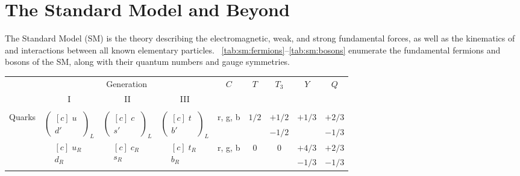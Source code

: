 \newcommand{\mtworow}[1]{\multirow{2}{*}{#1}}

\chapter{The Standard Model and Beyond}
\label{chap:theory}
The Standard Model (SM) is the theory describing the electromagnetic, weak, and strong fundamental forces, as well as the kinematics of and interactions between all known elementary particles.
\Tabs~\ref{tab:sm:fermions}--\ref{tab:sm:bosons} enumerate the fundamental fermions and bosons of the SM, along with their quantum numbers and gauge symmetries.

\begin{table}
  \centering
  \begin{tabular}{cccc|ccccc}
    \hline 
    & \multicolumn{3}{c|}{Generation} & \mtworow{$C$} & \mtworow{$T$} & \mtworow{$T_3$} & \mtworow{$Y$} & \mtworow{$Q$}\\
    & I & II & III & & & & &\\
    \hline
    & & & & & & & &\\
    \multirow{4}{*}{Quarks} &
    \mtworow{$\begin{pmatrix*}[c]\;u\;\\d'\end{pmatrix*}_L$} &
    \mtworow{$\begin{pmatrix*}[c]\;c\;\\s'\end{pmatrix*}_L$} &
    \mtworow{$\begin{pmatrix*}[c]\;t\;\\b'\end{pmatrix*}_L$} &
            \mtworow{r, g, b} & \mtworow{$1/2$} & $+1/2$      & \mtworow{$+1/3$} & $+2/3$\\
    & & & &                   &                 & $-1/2$      &                  & $-1/3$\\

                     &
    \mtworow{$\begin{matrix*}[c]\;u_R\;\\d_R\end{matrix*}$} &
    \mtworow{$\begin{matrix*}[c]\;c_R\;\\s_R\end{matrix*}$} &
    \mtworow{$\begin{matrix*}[c]\;t_R\;\\b_R\end{matrix*}$} &
            \mtworow{r, g, b} & \mtworow{0}     & \mtworow{0} &          $+4/3$  & $+2/3$\\
    & & & &                   &                 &             &          $-1/3$  & $-1/3$\\


\end{tabular}
\end{table}
